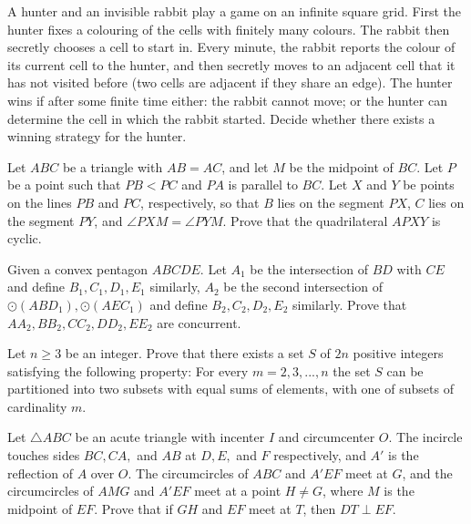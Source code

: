 \documentclass[11pt]{scrartcl}
\begin{document}
\begin{problem}[3470579368412517052]
	A hunter and an invisible rabbit play a game on an infinite square grid. First the hunter fixes a colouring of the cells with finitely many colours. The rabbit then secretly chooses a cell to start in. Every minute, the rabbit reports the colour of its current cell to the hunter, and then secretly moves to an adjacent cell that it has not visited before (two cells are adjacent if they share an edge). The hunter wins if after some finite time either:
the rabbit cannot move; or
the hunter can determine the cell in which the rabbit started.
Decide whether there exists a winning strategy for the hunter.
\end{problem}
\begin{problem}[883811987981100]
Let $ABC$ be a triangle with $AB=AC$, and let $M$ be the midpoint of $BC$. Let $P$ be a point such that $PB<PC$ and $PA$ is parallel to $BC$. Let $X$ and $Y$ be points on the lines $PB$ and $PC$, respectively, so that $B$ lies on the segment $PX$, $C$ lies on the segment $PY$, and $\angle PXM=\angle PYM$. Prove that the quadrilateral $APXY$ is cyclic.
\end{problem}
\begin{problem}[651308339506337942]
Given a convex pentagon $ ABCDE. $ Let $ A_1 $ be the intersection of $ BD $ with $ CE $ and define $ B_1, C_1, D_1, E_1 $ similarly, $ A_2 $ be the second intersection of $ \odot (ABD_1),\odot (AEC_1) $ and define $ B_2, C_2, D_2, E_2 $ similarly. Prove that $ AA_2, BB_2, CC_2, DD_2, EE_2 $ are concurrent.
\end{problem}
\begin{problem}[8059760967121829853]
	Let $n\geqslant 3$ be an integer. Prove that there exists a set $S$ of $2n$ positive integers satisfying the following property: For every $m=2,3,...,n$ the set $S$ can be partitioned into two subsets with equal sums of elements, with one of subsets of cardinality $m$.
\end{problem}
\begin{problem}[456772085666528]
Let $\triangle ABC$ be an acute triangle with incenter $I$ and circumcenter $O$. The incircle touches sides $BC,CA,$ and $AB$ at $D,E,$ and $F$ respectively, and $A'$ is the reflection of $A$ over $O$. The circumcircles of $ABC$ and $A'EF$ meet at $G$, and the circumcircles of $AMG$ and $A'EF$ meet at a point $H\neq G$, where $M$ is the midpoint of $EF$. Prove that if $GH$ and $EF$ meet at $T$, then $DT\perp EF$.
\end{problem}
\end{document}
